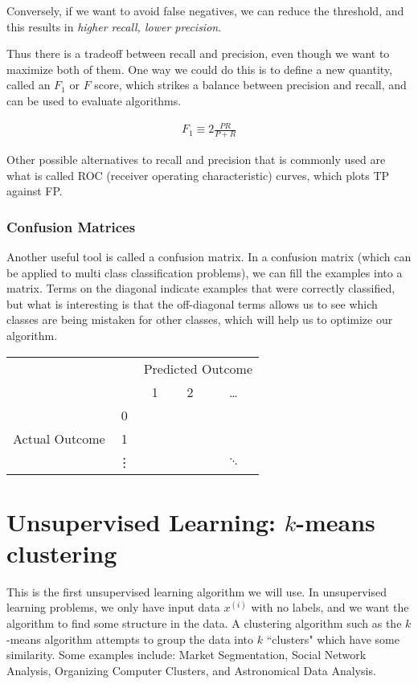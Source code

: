 \documentclass[letterpaper,10pt]{article}
\begin{document}
Conversely, if we want to avoid false negatives, we can reduce the threshold, and this results in \textit{higher recall, lower precision}.

Thus there is a tradeoff between recall and precision, even though we want to maximize both of them. One way we could do this is to define a new quantity, called an $F_1$ or $F$ score, which strikes a balance between precision and recall, and can be used to evaluate algorithms.

\begin{align}
F_1 \equiv 2 \frac{PR}{P+R}
\end{align}

Other possible alternatives to recall and precision that is commonly used are what is called ROC (receiver operating characteristic) curves, which plots TP against FP.

\subsubsection{Confusion Matrices}
Another useful tool is called a confusion matrix. In a confusion matrix (which can be applied to multi class classification problems), we can fill the examples into a matrix. Terms on the diagonal indicate examples that were correctly classified, but what is interesting is that the off-diagonal terms allows us to see which classes are being mistaken for other classes, which will help us to optimize our algorithm.

\begin{center}
\begin{tabular}{cc|c|c|c|}
\multicolumn{2}{c}{} & \multicolumn{3}{c}{Predicted Outcome} \\
\multicolumn{2}{c}{} &  \multicolumn{1}{c}{1}  &  \multicolumn{1}{c}{2}  & \multicolumn{1}{c}{\ldots}  \\
\cline{3-5}
\multirow{3}{*}{Actual Outcome} & 0 & &  & \\
\cline{3-5}
& 1 &  &  & \\
\cline{3-5}
& \vdots &  &  & $\ddots$ \\
\cline{3-5}
\end{tabular}
\end{center}


\section{Unsupervised Learning: $k$-means clustering}

This is the first unsupervised learning algorithm we will use. In unsupervised learning problems, we only have input data $x^{(i)}$ with no labels, and we want the algorithm to find some structure in the data. A clustering algorithm such as the $k$-means algorithm attempts to group the data into $k$ ``clusters" which have some similarity. Some examples include: Market Segmentation, Social Network Analysis, Organizing Computer Clusters, and Astronomical Data Analysis.
\end{document}
